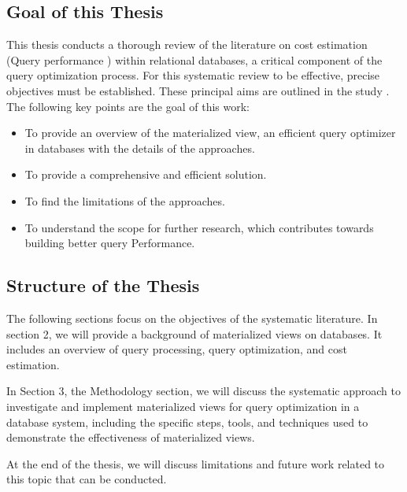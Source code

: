 \subsection{Goal of this Thesis}
\normalsize
This thesis conducts a thorough review of the literature on cost estimation (Query performance ) within relational databases, a critical component of the query optimization process. For this systematic review to be effective, precise objectives must be established. These principal aims are outlined in the study \cite{CostEstimation}. The following key points are the goal of this work: 
\begin{itemize}
  \item To provide an overview of the materialized view, an efficient query optimizer in databases with the details of the approaches.
  \item To provide a comprehensive and efficient solution.
  \item To find the limitations of the approaches.
  \item To understand the scope for further research, which contributes towards building
better query Performance. %
\end{itemize}
\subsection{Structure of the Thesis }
The following sections focus on the objectives of the systematic literature. In section 2, we will provide a background of materialized views on databases. It includes an overview of query processing, query optimization, and cost estimation.\vspace{.4cm}

In Section 3, the Methodology section, we will discuss the systematic approach to investigate and implement materialized views for query optimization in a database system, including the specific steps, tools, and techniques used to demonstrate the effectiveness of materialized views.\vspace{.4cm}

At the end of the thesis, we will discuss limitations and future work related to this topic that can be conducted.










